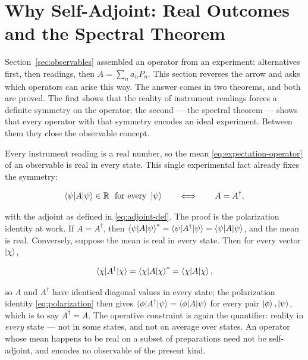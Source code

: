 \section{Why Self-Adjoint: Real Outcomes and the Spectral Theorem}
\label{sec:selfadjoint}

Section~\ref{sec:observables} assembled an operator from an experiment: alternatives first, then readings, then $A=\sum_na_nP_n$. This section reverses the arrow and asks which operators can arise this way. The answer comes in two theorems, and both are proved. The first shows that the reality of instrument readings forces a definite symmetry on the operator; the second --- the spectral theorem --- shows that every operator with that symmetry encodes an ideal experiment. Between them they close the observable concept.

Every instrument reading is a real number, so the mean \eqref{eq:expectation-operator} of an observable is real in every state. This single experimental fact already fixes the symmetry:
\begin{linenomath}
\begin{equation}
    \braket{\psi|A|\psi}\in\mathbb{R}\ \ \text{for every }\ket{\psi}
    \qquad\Longleftrightarrow\qquad
    A=A^\dagger ,
    \label{eq:selfadjoint-reality}
\end{equation}
\end{linenomath}
with the adjoint as defined in \eqref{eq:adjoint-def}. The proof is the polarization identity at work. If $A=A^\dagger$, then $\braket{\psi|A|\psi}^{*}=\braket{\psi|A^\dagger|\psi}=\braket{\psi|A|\psi}$, and the mean is real. Conversely, suppose the mean is real in every state. Then for every vector $\ket{\chi}$,
\begin{linenomath}
\begin{equation}
    \braket{\chi|A^\dagger|\chi}
    =\braket{\chi|A|\chi}^{*}
    =\braket{\chi|A|\chi},
\end{equation}
\end{linenomath}
so $A$ and $A^\dagger$ have identical diagonal values in every state; the polarization identity \eqref{eq:polarization} then gives $\braket{\phi|A^\dagger|\psi}=\braket{\phi|A|\psi}$ for every pair $\ket{\phi},\ket{\psi}$, which is to say $A^\dagger=A$. The operative constraint is again the quantifier: reality in \emph{every} state --- not in some states, and not on average over states. An operator whose mean happens to be real on a subset of preparations need not be self-adjoint, and encodes no observable of the present kind.

